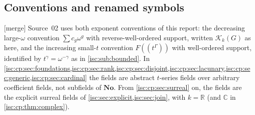 \documentclass[11pt,letterpaper]{article}
\theoremstyle{definition}
\theoremstyle{remark}
\newcommand{\No}{\mathbf{No}}
\newcommand{\R}{\mathbb R}
\newcommand{\C}{\mathbb C}
\newcommand{\K}[2]{\mathcal K_{#1}(#2)}
\newcommand{\mtag}{\textup{[merge]}}%
\numberwithin{equation}{section}
\begin{document}
\subsection{Conventions and renamed symbols}
\label{isc:cp:sec:conventions}

\mtag{} Source~02 uses both exponent conventions of this report: the
decreasing large-$\omega$ convention $\sum c_g\omega^g$ with
reverse-well-ordered support, written $\K{k}{G}$ as here, and the
increasing small-$t$ convention $F((t^\Gamma))$ with well-ordered support,
identified by $t^\gamma=\omega^{-\gamma}$ as in \cref{isc:sub:bounded}. In
\cref{isc:cp:sec:foundations,isc:cp:sec:rank,isc:cp:sec:disjoint,isc:cp:sec:lacunary,isc:cp:sec:generic,isc:cp:sec:cardinal}
the fields are abstract $t$-series fields over arbitrary coefficient fields,
not subfields of $\No$. From \cref{isc:cp:sec:surreal} on, the fields are
the explicit surreal fields of \cref{isc:sec:explicit,isc:sec:join}, with
$k=\R$ (and $\C$ in \cref{isc:cp:thm:complex}).
\end{document}
